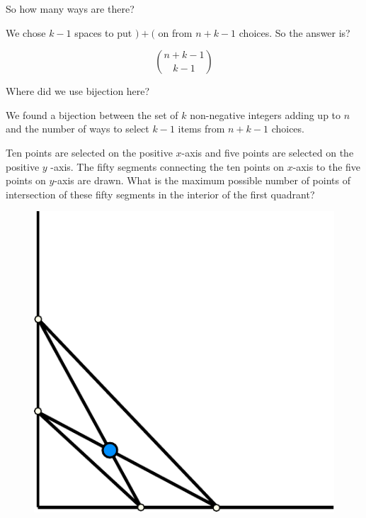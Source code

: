 \documentclass[compress]{beamer}
\begin{document}
\begin{frame}
    So how many ways are there?

    \pause\vspace{1em}

    We chose $k-1$ spaces to put $)+($ on from $n+k-1$ choices. So the answer
    is?

    \pause\vspace{1em}

    \[\boxed{{n+k-1 \choose k-1}}\]

    \pause\vspace{1em}

    Where did we use bijection here?

    \pause\vspace{1em}

    We found a bijection between \textcolor{NordBlue}{the set of $k$
    non-negative integers adding up to $n$} and \textcolor{NordBlue}{the
    number of ways to select $k-1$ items from $n+k-1$ choices}.
\end{frame}


\begin{frame}

    \textcolor{NordOrange}{
        Ten points are selected on the positive $x$-axis and five points are
        selected on the positive $y$ -axis. The fifty segments connecting the
        ten points on $x$-axis to the five points on $y$-axis are drawn.
        What is the maximum possible number of points of intersection of these
        fifty segments in the interior of the first quadrant?
    }

    \begin{figure}
        \begin{center}
            \includegraphics[width=.35\linewidth]{problem_1.pdf}
        \end{center}
    \end{figure}
\end{frame}
\end{document}
